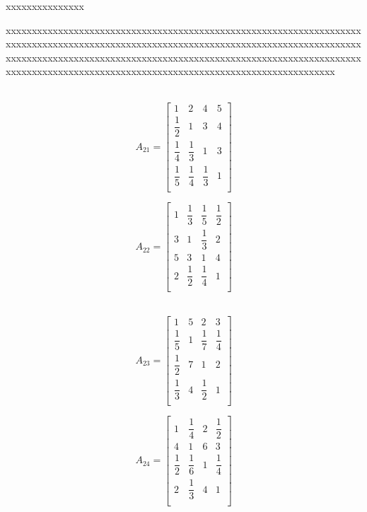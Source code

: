 \documentclass{beamer}
\begin{document}
\begin{frame}{xxxxxxxxxxxxxxx}
	
xxxxxxxxxxxxxxxxxxxxxxxxxxxxxxxxxxxxxxxxxxxxxxxxxxxxxxxxxxxxxxxxxxxxxxxxxxxxxxxxxxxxxxxxxxxxxxxxxxxxxxxxxxxxxxxxxxxxxxxxxxxxxxxxxxxxxxxxxxxxxxxxxxxxxxxxxxxxxxxxxxxxxxxxxxxxxxxxxxxxxxxxxxxxxxxxxxxxxxxxxxxxxxxxxxxxxxxxxxxxxxxxxxxxxxxxxxxxxxxxxxxxxxxxxxxxxxxxxxxxxxxxxxx

	\begin{minipage}{0.45\linewidth}
				　\scriptsize
\begin{equation}
	\label{a21}
	A_{21}=\left[ \begin{matrix}
		1&2&4&5\\
		\dfrac{1}{2}&1&3&4\\
		\dfrac{1}{4}&\dfrac{1}{3}&1&3\\
		\dfrac{1}{5}&\dfrac{1}{4}&\dfrac{1}{3}&1\\
	\end{matrix} \right] 
\end{equation}
	\end{minipage}
\begin{minipage}{0.45\linewidth}
			\scriptsize
\begin{equation}
	\label{a22}
	A_{22}=\left[ \begin{matrix}
		1&\dfrac{1}{3}&\dfrac{1}{5}&\dfrac{1}{2}\\
		3&1&\dfrac{1}{3}&2\\
		5&3&1&4\\
		2&\dfrac{1}{2}&\dfrac{1}{4}&1\\
	\end{matrix} \right] 
\end{equation}	
	\end{minipage}

\begin{minipage}{0.45\linewidth}
		　\scriptsize
\begin{equation}
	\label{a23}
	A_{23}=\left[ \begin{matrix}
		1&5&2&3\\
		\dfrac{1}{5}&1&\dfrac{1}{7}&\dfrac{1}{4}\\
		\dfrac{1}{2}&7&1&2\\
		\dfrac{1}{3}&4&\dfrac{1}{2}&1\\
	\end{matrix} \right] 
\end{equation}
	\end{minipage}
\begin{minipage}{0.45\linewidth}
		\scriptsize
\begin{equation}
	\label{a24}
	A_{24}=\left[ \begin{matrix}
		1&\dfrac{1}{4}&2&\dfrac{1}{2}\\
		4&1&6&3\\
		\dfrac{1}{2}&\dfrac{1}{6}&1&\dfrac{1}{4}\\
		2&\dfrac{1}{3}&4&1\\
	\end{matrix} \right] 
\end{equation}
	\end{minipage}
\end{frame}
\end{document}
